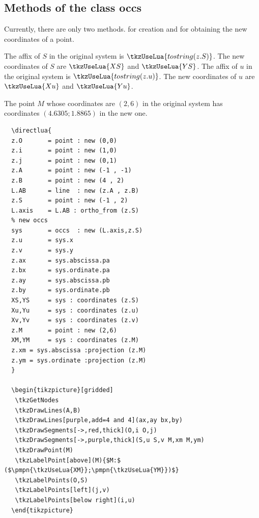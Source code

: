 
\subsection{Methods of the class occs} %
\label{sub:methods_of_the_class_occs}

Currently, there are only two methods.  for creation and  for obtaining the new coordinates of a point.

The affix of $S$ in the original system is $\tkzUseLua{tostring(z.S)}$.
The new coordinates of $S$ are $\tkzUseLua{XS}$ and $\tkzUseLua{YS}$.
The affix of $u$ in the original system is $\tkzUseLua{tostring(z.u)}$.
The new coordinates of $u$ are $\tkzUseLua{Xu}$ and $\tkzUseLua{Yu}$.

The point $M$ whose coordinates are $(2,6)$ in the original system has coordinates $(4.6305; 1.8865)$ in the new one.

\begin{Verbatim}
  \directlua{
  z.O       = point : new (0,0)
  z.i       = point : new (1,0)
  z.j       = point : new (0,1)
  z.A       = point : new (-1 , -1)
  z.B       = point : new (4 , 2)
  L.AB      = line  : new (z.A , z.B)
  z.S       = point : new (-1 , 2)  
  L.axis    = L.AB : ortho_from (z.S)        
  % new occs          
  sys       = occs  : new (L.axis,z.S)
  z.u       = sys.x
  z.v       = sys.y
  z.ax      = sys.abscissa.pa
  z.bx      = sys.ordinate.pa
  z.ay      = sys.abscissa.pb
  z.by      = sys.ordinate.pb
  XS,YS     = sys : coordinates (z.S)
  Xu,Yu     = sys : coordinates (z.u)
  Xv,Yv     = sys : coordinates (z.v)
  z.M       = point : new (2,6)
  XM,YM     = sys : coordinates (z.M)
  z.xm = sys.abscissa :projection (z.M) 
  z.ym = sys.ordinate :projection (z.M) 
  }

  \begin{tikzpicture}[gridded]
   \tkzGetNodes
   \tkzDrawLines(A,B)
   \tkzDrawLines[purple,add=4 and 4](ax,ay bx,by)
   \tkzDrawSegments[->,red,thick](O,i O,j)
   \tkzDrawSegments[->,purple,thick](S,u S,v M,xm M,ym)
   \tkzDrawPoint(M)
   \tkzLabelPoint[above](M){$M:$ ($\pmpn{\tkzUseLua{XM}};\pmpn{\tkzUseLua{YM}})$}
   \tkzLabelPoints(O,S)
   \tkzLabelPoints[left](j,v)
   \tkzLabelPoints[below right](i,u)
  \end{tikzpicture}
\end{Verbatim}

